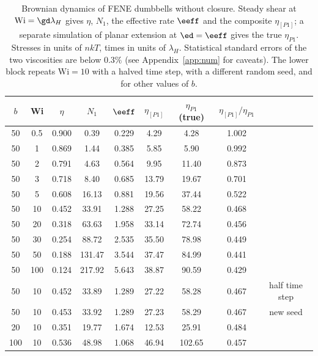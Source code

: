 \begin{table}
\caption{Brownian dynamics of FENE dumbbells without closure. Steady shear at $\mathrm{Wi}=\gd\lambda_H$ gives $\eta$, $N_1$, the effective rate $\eeff$ and the composite $\eta_{[P1]}$; a separate simulation of planar extension at $\ed=\eeff$ gives the true $\eta_{P1}$. Stresses in units of $nkT$, times in units of $\lambda_H$. Statistical standard errors of the two viscosities are below $0.3\%$ (see Appendix~\ref{app:num} for caveats). The lower block repeats $\mathrm{Wi}=10$ with a halved time step, with a different random seed, and for other values of $b$.}
\begin{ruledtabular}
\begin{tabular}{ccccccccc}
$b$ & Wi & $\eta$ & $N_1$ & $\eeff$ & $\eta_{[P1]}$ & $\eta_{P1}$ (true) & $\eta_{[P1]}/\eta_{P1}$ & \\
\hline
50 & 0.5 & 0.900 & 0.39 & 0.229 & 4.29 & 4.28 & 1.002 & \\
50 & 1 & 0.869 & 1.44 & 0.385 & 5.85 & 5.90 & 0.992 & \\
50 & 2 & 0.791 & 4.63 & 0.564 & 9.95 & 11.40 & 0.873 & \\
50 & 3 & 0.718 & 8.40 & 0.685 & 13.79 & 19.67 & 0.701 & \\
50 & 5 & 0.608 & 16.13 & 0.881 & 19.56 & 37.44 & 0.522 & \\
50 & 10 & 0.452 & 33.91 & 1.288 & 27.25 & 58.22 & 0.468 & \\
50 & 20 & 0.318 & 63.63 & 1.958 & 33.14 & 72.74 & 0.456 & \\
50 & 30 & 0.254 & 88.72 & 2.535 & 35.50 & 78.98 & 0.449 & \\
50 & 50 & 0.188 & 131.47 & 3.544 & 37.47 & 84.99 & 0.441 & \\
50 & 100 & 0.124 & 217.92 & 5.643 & 38.87 & 90.59 & 0.429 & \\
\hline
50 & 10 & 0.452 & 33.89 & 1.289 & 27.22 & 58.28 & 0.467 & half time step\\
50 & 10 & 0.453 & 33.92 & 1.289 & 27.23 & 58.29 & 0.467 & new seed\\
20 & 10 & 0.351 & 19.77 & 1.674 & 12.53 & 25.91 & 0.484 & \\
100 & 10 & 0.536 & 48.98 & 1.068 & 46.94 & 102.65 & 0.457 & \\
\end{tabular}
\end{ruledtabular}
\end{table}
